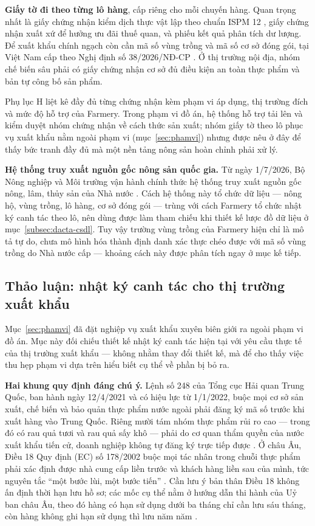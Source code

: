 \noindent\textbf{Giấy tờ đi theo từng lô hàng}, cấp riêng cho mỗi chuyến hàng. Quan trọng nhất là giấy chứng nhận kiểm dịch thực vật lập theo chuẩn ISPM 12 \parencite{ippc_ispm12}, giấy chứng nhận xuất xứ để hưởng ưu đãi thuế quan, và phiếu kết quả phân tích dư lượng. Để xuất khẩu chính ngạch còn cần mã số vùng trồng và mã số cơ sở đóng gói, tại Việt Nam cấp theo Nghị định số 38/2026/NĐ-CP \parencite{ppd_masovungtrong}. Ở thị trường nội địa, nhóm chế biến sâu phải có giấy chứng nhận cơ sở đủ điều kiện an toàn thực phẩm và bản tự công bố sản phẩm.

Phụ lục H liệt kê đầy đủ từng chứng nhận kèm phạm vi áp dụng, thị trường đích và mức độ hỗ trợ của Farmery. Trong phạm vi đồ án, hệ thống hỗ trợ tải lên và kiểm duyệt nhóm chứng nhận về cách thức sản xuất; nhóm giấy tờ theo lô phục vụ xuất khẩu nằm ngoài phạm vi (mục~\ref{sec:phamvi}) nhưng được nêu ở đây để thấy bức tranh đầy đủ mà một nền tảng nông sản hoàn chỉnh phải xử lý.

\noindent\textbf{Hệ thống truy xuất nguồn gốc nông sản quốc gia.} Từ ngày 1/7/2026, Bộ Nông nghiệp và Môi trường vận hành chính thức hệ thống truy xuất nguồn gốc nông, lâm, thủy sản của Nhà nước \parencite{traceviet_2026}. Cách hệ thống này tổ chức dữ liệu --- nông hộ, vùng trồng, lô hàng, cơ sở đóng gói --- trùng với cách Farmery tổ chức nhật ký canh tác theo lô, nên dùng được làm tham chiếu khi thiết kế lược đồ dữ liệu ở mục~\ref{subsec:dacta-csdl}. Tuy vậy trường vùng trồng của Farmery hiện chỉ là mô tả tự do, chưa mô hình hóa thành định danh xác thực chéo được với mã số vùng trồng do Nhà nước cấp --- khoảng cách này được phân tích ngay ở mục kế tiếp.

\subsection{Thảo luận: nhật ký canh tác cho thị trường xuất khẩu}
\label{subsec:nhatkycanhtac-xuatkhau}

Mục~\ref{sec:phamvi} đã đặt nghiệp vụ xuất khẩu xuyên biên giới ra ngoài phạm vi đồ án. Mục này đối chiếu thiết kế nhật ký canh tác hiện tại với yêu cầu thực tế của thị trường xuất khẩu --- không nhằm thay đổi thiết kế, mà để cho thấy việc thu hẹp phạm vi dựa trên hiểu biết cụ thể về phần bị bỏ ra.

\noindent\textbf{Hai khung quy định đáng chú ý.} Lệnh số 248 của Tổng cục Hải quan Trung Quốc, ban hành ngày 12/4/2021 và có hiệu lực từ 1/1/2022, buộc mọi cơ sở sản xuất, chế biến và bảo quản thực phẩm nước ngoài phải đăng ký mã số trước khi xuất hàng vào Trung Quốc. Riêng mười tám nhóm thực phẩm rủi ro cao --- trong đó có rau quả tươi và rau quả sấy khô --- phải do cơ quan thẩm quyền của nước xuất khẩu tiến cử, doanh nghiệp không tự đăng ký trực tiếp được \parencite{gacc_decree248}. Ở châu Âu, Điều 18 Quy định (EC) số 178/2002 buộc mọi tác nhân trong chuỗi thực phẩm phải xác định được nhà cung cấp liền trước và khách hàng liền sau của mình, tức nguyên tắc ``một bước lùi, một bước tiến'' \parencite{eu_gfl_178_2002}. Cần lưu ý bản thân Điều 18 không ấn định thời hạn lưu hồ sơ; các mốc cụ thể nằm ở hướng dẫn thi hành của Uỷ ban châu Âu, theo đó hàng có hạn sử dụng dưới ba tháng chỉ cần lưu sáu tháng, còn hàng không ghi hạn sử dụng thì lưu năm năm \parencite{ec_gfl_guidance}.

